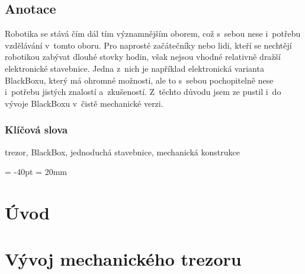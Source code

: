 \documentclass{template/priloha}
\author{Tomáš Vavrinec} %
\begin{document}
\maketitle

\pagestyle{empty}

\section*{Anotace}
\color{black}

Robotika se stává čím dál tím významnějším oborem, což s~sebou nese i~potřebu vzdělávání v~tomto oboru.
Pro naprosté začátečníky nebo lidi, kteří se nechtějí robotikou zabývat dlouhé stovky hodin, však nejsou vhodné 
relativně dražší elektronické stavebnice. Jedna z~nich je například elektronická varianta BlackBoxu, který má ohromné možnosti, 
ale to s~sebou pochopitelně nese i~potřebu jistých znalostí a~zkušeností.
Z~těchto důvodu jsem ze pustil i~do vývoje BlackBoxu v~čistě mechanické verzi.

\subsection*{Klíčová slova}

\color{black}

trezor, BlackBox, jednoduchá stavebnice, mechanická konstrukce %

\newpage

\newpage

\tableofcontents %

\voffset = -40pt
\headsep = 20mm

\newpage

\setcounter{figure}{0}
\setcounter{table}{0}

\pagestyle{fancy}


\chapter{Úvod}
\thispagestyle{fancy}


\chapter{Vývoj mechanického trezoru}
\thispagestyle{fancy}
\label{M-vyvoj}




\end{document}
